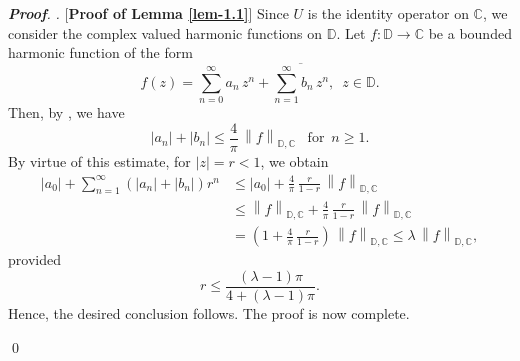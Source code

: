 \documentclass[a4paper,11pt, reqno]{amsart}
\theoremstyle{definition}
\newenvironment{pf}[1][]{%
	\vskip 3mm
	\noindent
	\ifthenelse{\equal{#1}{}}%
	{{\slshape {\bf Proof}. }}%
	{{\slshape #1.} }%
}%
{\qed\bigskip}
\newcommand{\norm}[1]{\left\lVert#1\right\rVert}
\newcommand{\comment}[1]{}
\begin{document}
\begin{pf} [{\bf Proof of Lemma \ref{lem-1.1}}]
Since $U$ is the identity operator on $\mathbb{C}$, we consider the complex valued harmonic functions on $\mathbb{D}$. Let $f:\mathbb{D} \rightarrow \mathbb{C}$ be a bounded harmonic function of the form
\begin{equation*}
	f(z)= \sum_{n=0}^{\infty} a_n\, z^n + \overline{\sum_{n=1}^{\infty} b_n\, z^n}, \,\,\, z \in \mathbb{D}.
\end{equation*}
Then, by \cite[Lemma 4]{Abu-2010}, we have 
\begin{equation*}
	|a_n|+ |b_n| \leq \frac{4}{\pi}\,\norm{f}_{\mathbb{D},\mathbb{C}}\,\,\,\,\, \mbox{for}\,\,\, n \geq 1.
\end{equation*}
By virtue of this estimate, for $|z|=r<1$, we obtain
\begin{align*}
|a_0|+ \sum_{n=1}^{\infty} (|a_n|+|b_n|)r^n 
& \leq |a_0|+ \frac{4}{\pi}\, \frac{r}{1-r}\,\norm{f}_{\mathbb{D},\mathbb{C}} \\
& \leq \norm{f}_{\mathbb{D},\mathbb{C}} + \frac{4}{\pi}\, \frac{r}{1-r}\,\norm{f}_{\mathbb{D},\mathbb{C}} \\
&= \left(1 + \frac{4}{\pi}\, \frac{r}{1-r} \right)\, \norm{f}_{\mathbb{D},\mathbb{C}} \leq \lambda \, \norm{f}_{\mathbb{D},\mathbb{C}},
\end{align*}
provided 
$$
r \leq \frac{(\lambda-1)\pi}{4+(\lambda-1)\pi}.
$$
Hence, the desired conclusion follows. The proof is now complete.
\comment{\\
	We now establish the part $(2)$. In this case, $U$ is the identity operator on $\mathcal{B}(\mathcal{H})$ and we consider the $\mathcal{B}(\mathcal{H})$ valued harmonic functions on $\mathbb{D}$. Let $f:\mathbb{D} \rightarrow \mathcal{B}(\mathcal{H})$ be a bounded harmonic function of the form
	\begin{equation*}
		f(z)= \sum_{n=0}^{\infty} a_n\, z^n + \sum_{n=1}^{\infty} b^{*}_n\, \overline{z}^n, \,\,\, z \in \mathbb{D}.
	\end{equation*}
	Then, by \cite[Lemma 4]{bhowmik-2021}, we have 
	\begin{equation*}
		||a_n||+ ||b_n|| \leq \frac{4}{\pi}\,\norm{f}_{\mathbb{D},\mathcal{B}(\mathcal{H})}\,\,\,\,\, \mbox{for}\,\,\, n \geq 1.
\end{equation*}}
\end{pf}



\\
\end{document}
